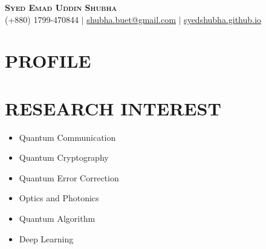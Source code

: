 \documentclass[letterpaper,11pt]{article}
\begin{document}
\begin{center}
    \textbf{\Huge \scshape Syed Emad Uddin Shubha} \\ \vspace{1pt}
    \small (+880) 1799-470844  $|$ \href{mailto:shubha.buet@gmail.com}{\underline{shubha.buet@gmail.com}} $|$
    \href{https://syedshubha.github.io}{\underline{syedshubha.github.io}}
\end{center}



\section{\textbf{PROFILE}}


\section*{\textbf{RESEARCH INTEREST}}
\begin{minipage}[t]{0.33\textwidth}
  \begin{itemize}[left=0cm]
    \setlength\itemsep{-0.075em} %
    \setlength\parskip{-0.075em} %
    \item Quantum Communication
    \item Quantum Cryptography
  \end{itemize}
\end{minipage}%
\begin{minipage}[t]{0.33\textwidth}
  \begin{itemize}[left=0cm]
    \setlength\itemsep{-0.075em} %
    \setlength\parskip{-0.075em} %
    \item Quantum Error Correction
    \item Optics and Photonics
  \end{itemize}
\end{minipage}%
\begin{minipage}[t]{0.33\textwidth}
  \begin{itemize}[left=0cm]
    \setlength\itemsep{-0.075em} %
    \setlength\parskip{-0.075em}
    \item Quantum Algorithm
    \item Deep Learning
  \end{itemize}
\end{minipage}
\end{document}
